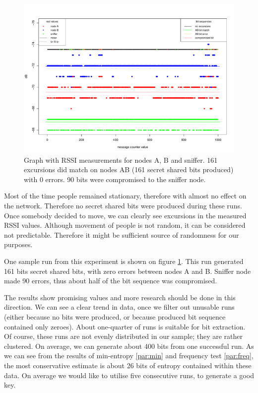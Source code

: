 \documentclass[
  print, %
  Table,   %
  nolof,     %
  nolot,     %
           oneside
]{fithesis3}
\begin{document}
  \begin{figure}
    \includegraphics[height=\textwidth, angle = 90]{../images/graph_rssi_04.pdf}
  \caption{Graph with RSSI measurements for nodes A, B and sniffer. 161 excursions did match on nodes AB (161 secret shared bits produced) with 0 errors. 90 bits were compromised to the sniffer node.}
  \label{fig:rssi_04}
  \end{figure}

  Most of the time people remained stationary, therefore with almost no effect on the network. Therefore no secret shared bits were produced during these runs. Once somebody decided to move, we can clearly see excursions in the measured RSSI values. Although movement of people is not random, it can be considered not predictable. Therefore it might be sufficient source of randomness for our purposes.

  One sample run from this experiment is shown on figure \ref{fig:rssi_04}. This run generated 161 bits secret shared bits, with zero errors between nodes A and B. Sniffer node made 90 errors, thus about half of the bit sequence was compromised.

  The results show promising values and more research should be done in this direction. We can see a clear trend in data, once we filter out unusable runs (either because no bits were produced, or because produced bit sequence contained only zeroes). About one-quarter of runs is suitable for bit extraction. Of course, these runs are not evenly distributed in our sample; they are rather clustered. On average, we can generate about 400 bits from one successful run. As we can see from the results of min-entropy \ref{par:min} and frequency test \ref{par:freq}, the most conservative estimate is about 26 bits of entropy contained within these data. On average we would like to utilise five consecutive runs, to generate a good key.
\end{document}

